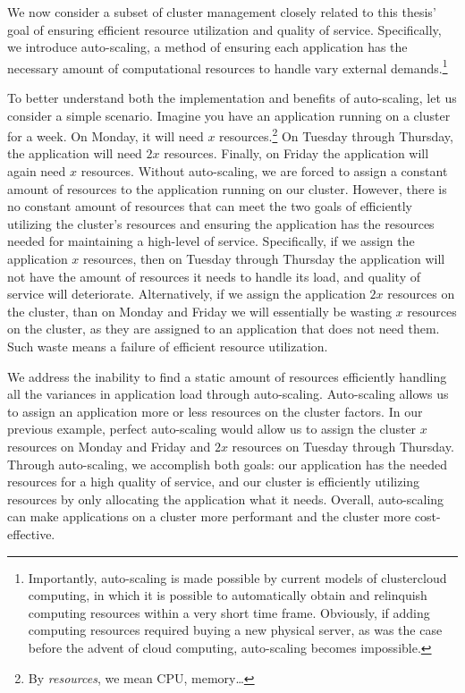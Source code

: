 We now consider a subset of cluster management closely related to
this thesis' goal of ensuring efficient resource utilization and quality of
service. Specifically, we introduce
auto-scaling, a method of ensuring each application has the necessary amount
of computational resources to handle vary external
demands.\footnote{Importantly, auto-scaling is
made possible by current models of cluster\/cloud computing, in which it is
possible to automatically obtain and relinquish computing resources within a
very short time frame. Obviously, if adding computing resources required buying
a new physical server, as was the case before the advent of cloud computing,
auto-scaling becomes impossible.}

To better understand both the implementation and benefits of auto-scaling, let
us consider a simple scenario. Imagine you have an application running on a
cluster for a week. On Monday, it will need $x$ resources.\footnote{By
  \textit{resources}, we mean CPU, memory\dots} On Tuesday through
Thursday, the application will need $2x$ resources. Finally, on Friday the
application will again need $x$ resources. Without auto-scaling, we are forced
to assign a constant amount of resources to the application running on our
cluster. However, there is no constant amount of resources that can meet
the two goals of efficiently utilizing the cluster's resources and ensuring the
application has the resources needed for maintaining a high-level of service.
Specifically, if we assign the application $x$ resources,
then on Tuesday through Thursday the
application will not have the amount of resources it needs to handle its load,
and quality of service will deteriorate. Alternatively, if we assign the
application $2x$ resources on the cluster, than on Monday and Friday we will
essentially be wasting $x$ resources on the cluster, as they are assigned to an
application that does not need them. Such waste means a failure of efficient
resource utilization.

We address the inability to find a static amount of resources efficiently
handling all the variances in application load through auto-scaling.
Auto-scaling allows us to assign an application more or less resources on the
cluster factors. In our previous example, perfect auto-scaling
would allow us to assign the cluster $x$ resources on Monday and Friday and
$2x$ resources on Tuesday through Thursday. Through auto-scaling, we accomplish
both goals: our application has the needed resources for a high quality
of service, and our cluster is efficiently utilizing resources by only
allocating the application what it needs.
Overall, auto-scaling can make applications on a cluster more performant and
the cluster more cost-effective.

